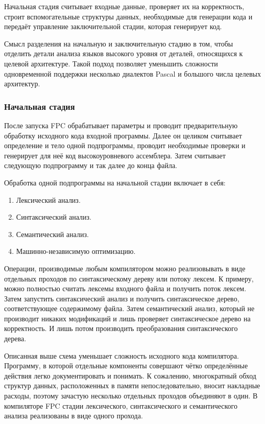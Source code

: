 \documentclass{imcs}
\begin{document}
Начальная стадия считывает входные данные, проверяет их на корректность, строит
вспомогательные структуры данных, необходимые для генерации кода и передаёт 
управление заключительной стадии, которая генерирует код.

Смысл разделения на начальную и заключительную стадию в
том, чтобы отделить детали анализа языков высокого уровня от деталей,
относящихся к целевой архитектуре. Такой подход позволяет уменьшить сложности
одновременной поддержки несколько диалектов Pascal и большого числа целевых
архитектур.

\subsubsection{Начальная стадия}

После запуска FPC обрабатывает параметры и проводит предварительную обработку
исходного кода входной программы. Далее он целиком считывает определение и тело
одной подпрограммы, проводит необходимые проверки и генерирует для неё
код высокоуровневого ассемблера. Затем считывает следующую подпрограмму и так далее
до конца файла.

Обработка одной подпрограммы на начальной стадии включает в себя:
\begin{enumerate}
    \item Лексический анализ.
    \item Синтаксический анализ.
    \item Семантический анализ.
    \item Машинно-независимую оптимизацию.
\end{enumerate}

Операции, производимые любым компилятором можно реализовывать в виде
отдельных проходов по синтаксическому дереву или потоку лексем. К примеру, можно
полностью считать лексемы входного файла и получить поток лексем. Затем запустить
синтаксический анализ и получить синтаксическое дерево, соответствующее содержимому
файла. Затем семантический анализ, который не производит никаких модификаций и 
лишь проверяет синтаксическое дерево на корректность. И лишь потом производить
преобразования синтаксического дерева.

Описанная выше схема уменьшает сложность исходного кода компилятора. Программу, в которой отдельные 
компоненты совершают чётко определённые действия легко документировать и понимать.
К сожалению, многократный обход структур данных, расположенных в памяти непоследовательно,
вносит накладные расходы\cite{kaspersky}, поэтому
зачастую несколько отдельных проходов объединяют в один. В компиляторе FPC стадии
лексического, синтаксического и семантического анализа реализованы в виде одного
прохода. 
\end{document}
